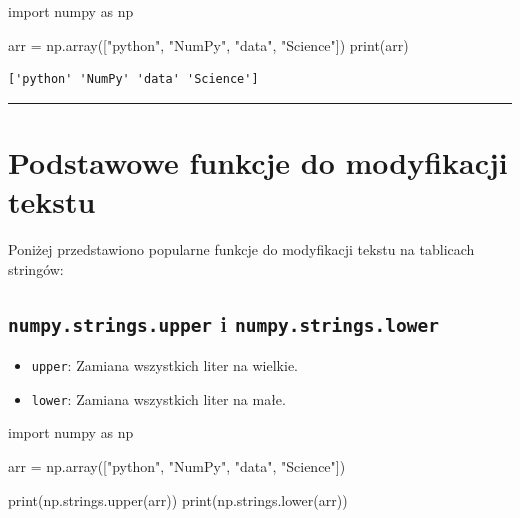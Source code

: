 \documentclass[
  polish,
  letterpaper,
  DIV=11,
  numbers=noendperiod]{scrreprt}
\newenvironment{Shaded}{\begin{snugshade}}{\end{snugshade}}
\newcommand{\BuiltInTok}[1]{\textcolor[rgb]{0.00,0.23,0.31}{#1}}
\newcommand{\ImportTok}[1]{\textcolor[rgb]{0.00,0.46,0.62}{#1}}
\newcommand{\NormalTok}[1]{\textcolor[rgb]{0.00,0.23,0.31}{#1}}
\newcommand{\OperatorTok}[1]{\textcolor[rgb]{0.37,0.37,0.37}{#1}}
\newcommand{\StringTok}[1]{\textcolor[rgb]{0.13,0.47,0.30}{#1}}
\providecommand{\tightlist}{%
  \setlength{\itemsep}{0pt}\setlength{\parskip}{0pt}}
\begin{document}
\begin{Shaded}
\begin{Highlighting}[]
\ImportTok{import}\NormalTok{ numpy }\ImportTok{as}\NormalTok{ np}

\NormalTok{arr }\OperatorTok{=}\NormalTok{ np.array([}\StringTok{"python"}\NormalTok{, }\StringTok{"NumPy"}\NormalTok{, }\StringTok{"data"}\NormalTok{, }\StringTok{"Science"}\NormalTok{])}
\BuiltInTok{print}\NormalTok{(arr)}
\end{Highlighting}
\end{Shaded}

\begin{verbatim}
['python' 'NumPy' 'data' 'Science']
\end{verbatim}

\begin{center}\rule{0.5\linewidth}{0.5pt}\end{center}

\section{Podstawowe funkcje do modyfikacji
tekstu}\label{podstawowe-funkcje-do-modyfikacji-tekstu}

Poniżej przedstawiono popularne funkcje do modyfikacji tekstu na
tablicach stringów:

\subsection{\texorpdfstring{\texttt{numpy.strings.upper} i
\texttt{numpy.strings.lower}}{numpy.strings.upper i numpy.strings.lower}}\label{numpy.strings.upper-i-numpy.strings.lower}

\begin{itemize}
\tightlist
\item
  \texttt{upper}: Zamiana wszystkich liter na wielkie.
\item
  \texttt{lower}: Zamiana wszystkich liter na małe.
\end{itemize}

\begin{Shaded}
\begin{Highlighting}[]
\ImportTok{import}\NormalTok{ numpy }\ImportTok{as}\NormalTok{ np}

\NormalTok{arr }\OperatorTok{=}\NormalTok{ np.array([}\StringTok{"python"}\NormalTok{, }\StringTok{"NumPy"}\NormalTok{, }\StringTok{"data"}\NormalTok{, }\StringTok{"Science"}\NormalTok{])}

\BuiltInTok{print}\NormalTok{(np.strings.upper(arr))}
\BuiltInTok{print}\NormalTok{(np.strings.lower(arr))}
\end{Highlighting}
\end{Shaded}
\end{document}
